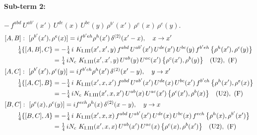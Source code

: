 \documentclass[10pt]{article}
\numberwithin{equation}{section}
\begin{document}
\paragraph{Sub-term 2:} $-\,f^{abd}\,U^{ab'}(x')\,U^{de}(x)\,U^{bc}(y)\,\rho^{b'}(x')\,\rho^{e}(x)\,\rho^{c}(y)$.
\begin{align}
&[A,B]:\ [\rho^{b'}(x'),\rho^{e}(x)]=i f^{b'eh}\rho^{h}(x')\,\delta^{(2)}(x'-x),\quad x\to x'\notag\\
&\qquad \tfrac14\{[A,B],C\}=-\tfrac14\,i\,\,K_{\rm I.III}(x',x',y)\,f^{abd}\,U^{ab'}(x')\,U^{de}(x')\,U^{bc}(y)\,f^{b'eh}\,\big\{\rho^{h}(x'),\rho^{c}(y)\big\}\notag\\
&\qquad\phantom{\tfrac14\{[A,B],C\}}=\tfrac14\,i N_{c}\,\,K_{\rm I.III}(x',x',y)\,U^{ab}(y)\,U^{ac}(x')\,\big\{\rho^{c}(x'),\rho^{b}(y)\big\}\quad\text{(U2)},\ \text{(F)}
\label{eq:GI.III-2-AB}\\
&[A,C]:\ [\rho^{b'}(x'),\rho^{c}(y)]=i f^{b'ch}\rho^{h}(x')\,\delta^{(2)}(x'-y),\quad y\to x'\notag\\
&\qquad \tfrac14\{[A,C],B\}=-\tfrac14\,i\,\,K_{\rm I.III}(x',x,x')\,f^{abd}\,U^{ab'}(x')\,U^{de}(x)\,U^{bc}(x')\,f^{b'ch}\,\big\{\rho^{h}(x'),\rho^{e}(x)\big\}\notag\\
&\qquad\phantom{\tfrac14\{[A,C],B\}}=-\tfrac14\,i N_{c}\,\,K_{\rm I.III}(x',x,x')\,U^{ab}(x)\,U^{ac}(x')\,\big\{\rho^{c}(x'),\rho^{b}(x)\big\}\quad\text{(U2)},\ \text{(F)}
\label{eq:GI.III-2-AC}\\
&[B,C]:\ [\rho^{e}(x),\rho^{c}(y)]=i f^{ech}\rho^{h}(x)\,\delta^{(2)}(x-y),\quad y\to x\notag\\
&\qquad \tfrac14\{[B,C],A\}=-\tfrac14\,i\,\,K_{\rm I.III}(x',x,x)\,f^{abd}\,U^{ab'}(x')\,U^{de}(x)\,U^{bc}(x)\,f^{ech}\,\big\{\rho^{h}(x),\rho^{b'}(x')\big\}\notag\\
&\qquad\phantom{\tfrac14\{[B,C],A\}}=\tfrac14\,i N_{c}\,\,K_{\rm I.III}(x',x,x)\,U^{ab}(x')\,U^{ac}(x)\,\big\{\rho^{c}(x),\rho^{b}(x')\big\}\quad\text{(U2)},\ \text{(F)}
\label{eq:GI.III-2-BC}
\end{align}
\end{document}
